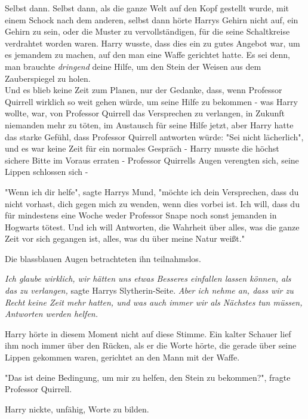 {Selbst dann. Selbst dann, als die ganze Welt auf den Kopf gestellt wurde, mit einem Schock nach dem anderen, selbst dann hörte Harrys Gehirn nicht auf, ein Gehirn zu sein, oder die Muster zu vervollständigen, für die seine Schaltkreise verdrahtet worden waren. Harry wusste, dass dies ein zu gutes Angebot war, um es jemandem zu machen, auf den man eine Waffe gerichtet hatte. Es sei denn, man brauchte \emph{dringend} deine Hilfe, um den Stein der Weisen aus dem Zauberspiegel zu holen.\\ Und es blieb keine Zeit zum Planen, nur der Gedanke, dass, wenn Professor Quirrell wirklich so weit gehen würde, um seine Hilfe zu bekommen - was Harry wollte, war, von Professor Quirrell das Versprechen zu verlangen, in Zukunft niemanden mehr zu töten, im Austausch für seine Hilfe jetzt, aber Harry hatte das starke Gefühl, dass Professor Quirrell antworten würde: "Sei nicht lächerlich", und es war keine Zeit für ein normales Gespräch - Harry musste die höchst sichere Bitte im Voraus erraten - Professor Quirrells Augen verengten sich, seine Lippen schlossen sich -

"Wenn ich dir helfe", sagte Harrys Mund, "möchte ich dein Versprechen, dass du nicht vorhast, dich gegen mich zu wenden, wenn dies vorbei ist. Ich will, dass du für mindestens eine Woche weder Professor Snape noch sonst jemanden in Hogwarts tötest. Und ich will Antworten, die Wahrheit über alles, was die ganze Zeit vor sich gegangen ist, alles, was du über meine Natur weißt."

Die blassblauen Augen betrachteten ihn teilnahmslos.

\emph{Ich glaube wirklich, wir hätten uns etwas Besseres einfallen lassen können, als das zu verlangen,} sagte Harrys Slytherin-Seite. \emph{Aber ich nehme an, dass wir zu Recht keine Zeit mehr hatten, und was auch immer wir als Nächstes tun müssen, Antworten werden helfen.}

Harry hörte in diesem Moment nicht auf diese Stimme. Ein kalter Schauer lief ihm noch immer über den Rücken, als er die Worte hörte, die gerade über seine Lippen gekommen waren, gerichtet an den Mann mit der Waffe.

"Das ist deine Bedingung, um mir zu helfen, den Stein zu bekommen?", fragte Professor Quirrell.

Harry nickte, unfähig, Worte zu bilden.

}
